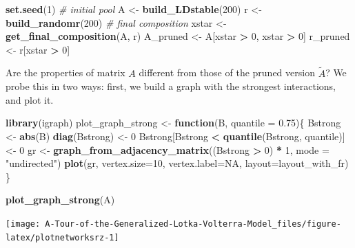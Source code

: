 \documentclass[]{book}
\newenvironment{Shaded}{\begin{snugshade}}{\end{snugshade}}
\newcommand{\CommentTok}[1]{\textcolor[rgb]{0.56,0.35,0.01}{\textit{#1}}}
\newcommand{\ControlFlowTok}[1]{\textcolor[rgb]{0.13,0.29,0.53}{\textbf{#1}}}
\newcommand{\DataTypeTok}[1]{\textcolor[rgb]{0.13,0.29,0.53}{#1}}
\newcommand{\DecValTok}[1]{\textcolor[rgb]{0.00,0.00,0.81}{#1}}
\newcommand{\FloatTok}[1]{\textcolor[rgb]{0.00,0.00,0.81}{#1}}
\newcommand{\KeywordTok}[1]{\textcolor[rgb]{0.13,0.29,0.53}{\textbf{#1}}}
\newcommand{\NormalTok}[1]{#1}
\newcommand{\OperatorTok}[1]{\textcolor[rgb]{0.81,0.36,0.00}{\textbf{#1}}}
\newcommand{\OtherTok}[1]{\textcolor[rgb]{0.56,0.35,0.01}{#1}}
\newcommand{\StringTok}[1]{\textcolor[rgb]{0.31,0.60,0.02}{#1}}
\begin{document}
\begin{Shaded}
\begin{Highlighting}[]
\KeywordTok{set.seed}\NormalTok{(}\DecValTok{1}\NormalTok{)}
\CommentTok{# initial pool}
\NormalTok{A <-}\StringTok{ }\KeywordTok{build_LDstable}\NormalTok{(}\DecValTok{200}\NormalTok{)}
\NormalTok{r <-}\StringTok{ }\KeywordTok{build_randomr}\NormalTok{(}\DecValTok{200}\NormalTok{)}
\CommentTok{# final composition}
\NormalTok{xstar <-}\StringTok{ }\KeywordTok{get_final_composition}\NormalTok{(A, r)}
\NormalTok{A_pruned <-}\StringTok{ }\NormalTok{A[xstar }\OperatorTok{>}\StringTok{ }\DecValTok{0}\NormalTok{, xstar }\OperatorTok{>}\StringTok{ }\DecValTok{0}\NormalTok{]}
\NormalTok{r_pruned <-}\StringTok{ }\NormalTok{r[xstar }\OperatorTok{>}\StringTok{ }\DecValTok{0}\NormalTok{]}
\end{Highlighting}
\end{Shaded}

Are the properties of matrix \(A\) different from those of the pruned version \(\tilde{A}\)? We probe this in two ways: first, we build a graph with the strongest interactions, and plot it.

\begin{Shaded}
\begin{Highlighting}[]
\KeywordTok{library}\NormalTok{(igraph)}
\NormalTok{plot_graph_strong <-}\StringTok{ }\ControlFlowTok{function}\NormalTok{(B, }\DataTypeTok{quantile =} \FloatTok{0.75}\NormalTok{)\{}
\NormalTok{  Bstrong <-}\StringTok{ }\KeywordTok{abs}\NormalTok{(B)}
  \KeywordTok{diag}\NormalTok{(Bstrong) <-}\StringTok{ }\DecValTok{0}
\NormalTok{  Bstrong[Bstrong }\OperatorTok{<}\StringTok{ }\KeywordTok{quantile}\NormalTok{(Bstrong, quantile)] <-}\StringTok{ }\DecValTok{0}
\NormalTok{  gr <-}\StringTok{ }\KeywordTok{graph_from_adjacency_matrix}\NormalTok{((Bstrong }\OperatorTok{>}\StringTok{ }\DecValTok{0}\NormalTok{) }\OperatorTok{*}\StringTok{ }\DecValTok{1}\NormalTok{, }\DataTypeTok{mode =} \StringTok{"undirected"}\NormalTok{)}
  \KeywordTok{plot}\NormalTok{(gr, }\DataTypeTok{vertex.size=}\DecValTok{10}\NormalTok{, }\DataTypeTok{vertex.label=}\OtherTok{NA}\NormalTok{, }\DataTypeTok{layout=}\NormalTok{layout_with_fr)}
\NormalTok{\}}

\KeywordTok{plot_graph_strong}\NormalTok{(A)}
\end{Highlighting}
\end{Shaded}

\begin{center}\texttt{[image: A-Tour-of-the-Generalized-Lotka-Volterra-Model\_files/figure-latex/plotnetworksrz-1]} \end{center}
\end{document}
